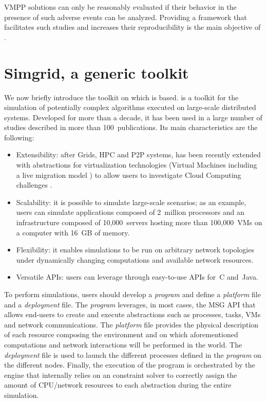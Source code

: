 VMPP solutions can only be reasonably evaluated if their behavior in
the presence of such adverse events can be analyzed. Providing a
framework that facilitates such studies and increases their
reproducibility is the main objective of \vmps.

\section{Simgrid, a generic toolkit}
\label{sec:sg}

We now briefly introduce the toolkit on which \vmps is based.  \sg is
a toolkit for the simulation of potentially complex algorithms
executed on large-scale distributed systems.  Developed for more than
a decade, it has been used in a large number of studies described in
more than 100~publications.  Its main characteristics are the
following:
\begin{itemize}
  \item Extensibility: after Grids, HPC and P2P systems, \sg has been
    recently extended with abstractions for virtualization
    technologies (\ie Virtual Machines including a live migration
    model \cite{Hirofuchi:2013:ALM:2568486.2568524}) to allow users to
    investigate Cloud Computing challenges \cite{lucas:cloud2014}.
  \item Scalability: it is possible to simulate large-scale scenarios;
    as an example, users can simulate applications composed of
    2~million processors and an infrastructure composed of
    10,000~servers hosting more than 100,000~VMs on a computer with
    16~GB of memory. 
  \item Flexibility: it enables simulations to be run on arbitrary
    network topologies under dynamically changing computations and
    available network resources.
  \item Versatile APIs: users can leverage \sg through easy-to-use
    APIs for~C and~Java.
\end{itemize}

To perform simulations, users should develop a \emph{program} and
define a \emph{platform} file and a \emph{deployment} file. The
\emph{program} leverages, in most cases, the \sg MSG API that allows
end-users to create and execute \sg abstractions such as processes,
tasks, VMs and network communications. The \emph{platform} file
provides the physical description of each resource composing the
environment and on which aforementioned computations and network
interactions will be performed in the \sg world.
The \emph{deployment} file is used to launch the different \sg
processes defined in the \emph{program} on the different nodes.
Finally, the execution of the program is orchestrated by the \sg
engine that internally relies on an constraint solver to correctly
assign the amount of CPU/network resources to each \sg abstraction
during the entire simulation.


